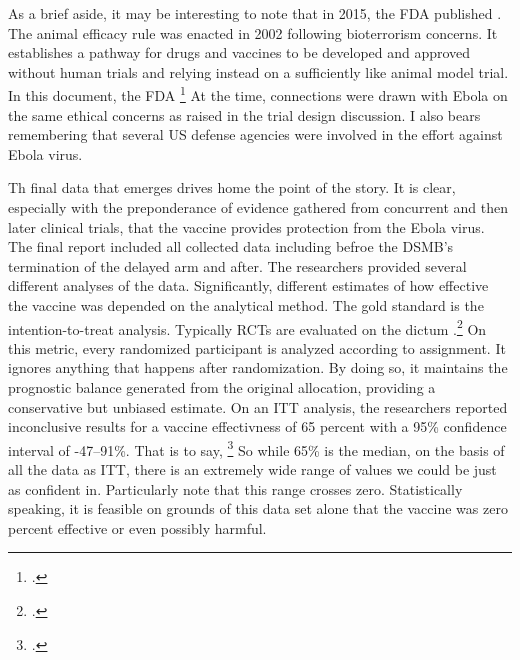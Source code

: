 \documentclass[letterpaper,notitlepage,12pt]{article}
\begin{document}
As a brief aside, it may be interesting to note that in 2015, the FDA published
.
The animal efficacy rule was enacted in 2002 following bioterrorism concerns.
It establishes a pathway for drugs and vaccines to be developed and approved
without human trials and relying instead on a sufficiently like animal model
trial.
In this document, the FDA \footcite{animal rule 2013}
At the time, connections were drawn with Ebola on the same ethical concerns as
raised in the trial design discussion.
I also bears remembering that several US defense agencies were involved in the
effort against Ebola virus.

Th final data that emerges drives home the point of the story.
It is clear, especially with the preponderance of evidence gathered from
concurrent and then later clinical trials, that the vaccine provides protection
from the Ebola virus.
The final report included all collected data including befroe the DSMB's
termination of the delayed arm and after. 
The researchers provided several different analyses of the data.
Significantly, different estimates of how effective the vaccine was depended on
the analytical method.
The gold standard is the intention-to-treat analysis.
Typically RCTs are evaluated on the dictum .\footcite{Heenekens et al 1987}
On this metric, every randomized participant is analyzed according to
assignment.
It ignores anything that happens after randomization.
By doing so, it maintains the prognostic balance generated from the original
allocation, providing a conservative but unbiased estimate.
On an ITT analysis, the researchers reported inconclusive results for a vaccine
effectivness of 65 percent with a 95\% confidence interval of -47--91\%.
That is to say, \footcite{ebm glossary}
So while 65\% is the median, on the basis of all the data as ITT, there is an
extremely wide range of values we could be just as confident in.
Particularly note that this range crosses zero.
Statistically speaking, it is feasible on grounds of this data set alone that
the vaccine was zero percent effective or even possibly harmful.
\end{document}
